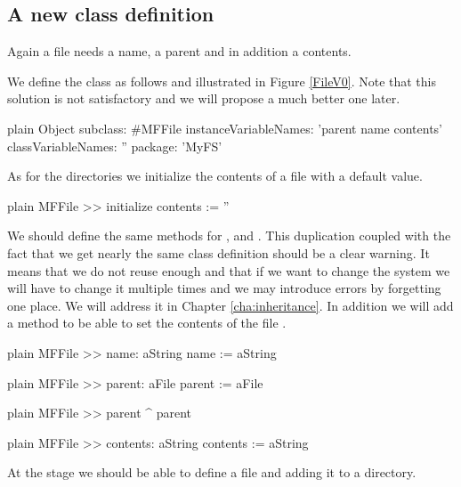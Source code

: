 \documentclass[10pt,twoside,english]{_support/latex/sbabook/sbabook}
\begin{document}
\subsection{A new class definition}
Again a file needs a name, a parent and in addition a contents.

We define the class  as follows and illustrated in Figure \ref{FileV0}.
Note that this solution is not satisfactory and we will propose a much better one later.

\begin{displaycode}{plain}
Object subclass: #MFFile
	instanceVariableNames: 'parent name contents'
	classVariableNames: ''
	package: 'MyFS'
\end{displaycode}

As for the directories we initialize the contents of a file with a default value. 

\begin{displaycode}{plain}
MFFile >> initialize
	contents := ''
\end{displaycode}

We should define the same methods for ,  and . This duplication coupled with the fact that we get nearly the same class definition should be a clear warning. It means that we do not reuse enough and that if we want to change the system we will have to change it multiple times and we may introduce errors by forgetting one place. 
We will address it in Chapter \ref{cha:inheritance}. In addition we will add a method to be able to set the contents of the file .

\begin{displaycode}{plain}
MFFile >> name: aString
	name := aString
\end{displaycode}

\begin{displaycode}{plain}
MFFile >> parent: aFile
	parent := aFile
\end{displaycode}

\begin{displaycode}{plain}
MFFile >> parent
	^ parent
\end{displaycode}

\begin{displaycode}{plain}
MFFile >> contents: aString
	contents := aString
\end{displaycode}

At the stage we should be able to define a file and adding it to a directory.
\end{document}
